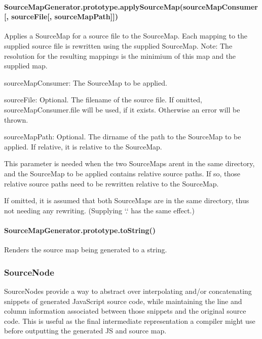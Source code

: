 \paragraph*{Source\+Map\+Generator.\+prototype.\+apply\+Source\+Map(source\+Map\+Consumer\mbox{[}, source\+File\mbox{[}, source\+Map\+Path\mbox{]}\mbox{]})}

Applies a Source\+Map for a source file to the Source\+Map. Each mapping to the supplied source file is rewritten using the supplied Source\+Map. Note\+: The resolution for the resulting mappings is the minimium of this map and the supplied map.


\begin{DoxyItemize}
\item {\ttfamily source\+Map\+Consumer}\+: The Source\+Map to be applied.
\item {\ttfamily source\+File}\+: Optional. The filename of the source file. If omitted, source\+Map\+Consumer.\+file will be used, if it exists. Otherwise an error will be thrown.
\item {\ttfamily source\+Map\+Path}\+: Optional. The dirname of the path to the Source\+Map to be applied. If relative, it is relative to the Source\+Map.

This parameter is needed when the two Source\+Maps aren\textquotesingle{}t in the same directory, and the Source\+Map to be applied contains relative source paths. If so, those relative source paths need to be rewritten relative to the Source\+Map.

If omitted, it is assumed that both Source\+Maps are in the same directory, thus not needing any rewriting. (Supplying `\textquotesingle{}.\textquotesingle{}` has the same effect.)
\end{DoxyItemize}

\paragraph*{Source\+Map\+Generator.\+prototype.\+to\+String()}

Renders the source map being generated to a string.

\subsubsection*{Source\+Node}

Source\+Nodes provide a way to abstract over interpolating and/or concatenating snippets of generated Java\+Script source code, while maintaining the line and column information associated between those snippets and the original source code. This is useful as the final intermediate representation a compiler might use before outputting the generated J\+S and source map.

